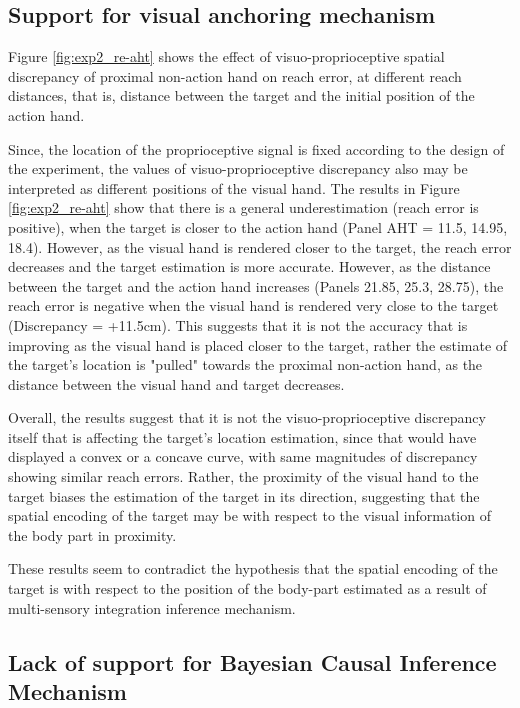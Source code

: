 \subsection{Support for visual anchoring mechanism}


Figure \ref{fig:exp2_re-aht} shows the effect of visuo-proprioceptive spatial discrepancy of proximal non-action hand on reach error, at different reach distances, that is, distance between the target and the initial position of the action hand. 

Since, the location of the proprioceptive signal is fixed according to the design of the experiment, the values of visuo-proprioceptive discrepancy also may be interpreted as different positions of the visual hand. The results in Figure \ref{fig:exp2_re-aht} show that there is a general underestimation (reach error is positive), when the target is closer to the action hand (Panel AHT = 11.5, 14.95, 18.4). However, as the visual hand is rendered closer to the target, the reach error decreases and the target estimation is more accurate. However, as the distance between the target and the action hand increases (Panels 21.85, 25.3, 28.75), the reach error is negative when the visual hand is rendered very close to the target (Discrepancy = +11.5cm). This suggests that it is not the accuracy that is improving as the visual hand is placed closer to the target, rather the estimate of the target's location is "pulled" towards the proximal non-action hand, as the distance between the visual hand and target decreases.

Overall, the results suggest that it is not the visuo-proprioceptive discrepancy itself that is affecting the target's location estimation, since that would have displayed a convex or a concave curve, with same magnitudes of discrepancy showing similar reach errors. Rather, the proximity of the visual hand to the target biases the estimation of the target in its direction, suggesting that the spatial encoding of the target may be with respect to the visual information of the body part in proximity.

These results seem to contradict the hypothesis that the spatial encoding of the target is with respect to the position of the body-part estimated as a result of multi-sensory integration inference mechanism. 

\subsection{Lack of support for Bayesian Causal Inference Mechanism}

